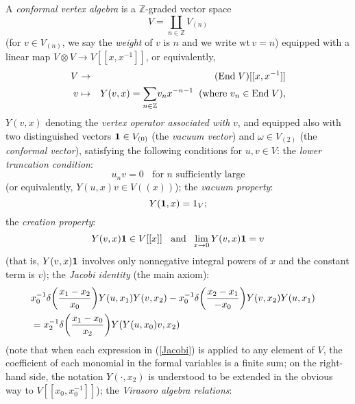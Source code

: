 \documentclass[12pt]{article}
\begin{document}
\begin{defi}\label{cva}
{\rm A {\it conformal vertex algebra} is a ${\mathbb Z}$-graded vector
space
\begin{equation}\label{Vgrading}
V=\coprod_{n\in{\mathbb Z}} V_{(n)}
\end{equation}
(for $v\in V_{(n)}$, we say the {\it weight} of $v$ is $n$ and we write
$\mbox{wt}\, v=n$)
equipped with a linear map $V\otimes V\to V[[x,
x^{-1}]]$, or equivalently,
\begin{eqnarray}\label{YforV}
V&\to&({\rm End}\; V)[[x, x^{-1}]] \nonumber\\
v&\mapsto& Y(v,
x)={\displaystyle \sum_{n\in{\mathbb Z}}}v_{n}x^{-n-1} \;\;(
\mbox{where }v_{n}\in{\rm End} \;V),
\end{eqnarray}
$Y(v, x)$ denoting the {\it vertex operator associated with} $v$, and
equipped also with two distinguished vectors ${\bf 1}\in V_{(0)}$ (the
{\it vacuum vector}) and $\omega\in V_{(2)}$ (the {\it conformal
vector}), satisfying the following conditions for $u,v \in V$:
the {\it lower truncation condition}:
\begin{equation}\label{ltc}
u_{n}v=0\;\;\mbox{ for }n\mbox{ sufficiently large}
\end{equation}
(or equivalently, $Y(u, x)v\in V((x))$); the {\it vacuum property}:
\begin{equation}\label{1left}
Y({\bf 1}, x)=1_V;
\end{equation}
the {\it creation property}:
\begin{equation}\label{1right}
Y(v, x){\bf 1} \in V[[x]]\;\;\mbox{ and }\;\lim_{x\rightarrow
0}Y(v, x){\bf 1}=v
\end{equation}
(that is, $Y(v, x){\bf 1}$ involves only nonnegative integral powers
of $x$ and the constant term is $v$); the {\it Jacobi identity} (the
main axiom):
\begin{eqnarray}
&x_0^{-1}\delta
\bigg({\displaystyle\frac{x_1-x_2}{x_0}}\bigg)Y(u, x_1)Y(v,
x_2)-x_0^{-1} \delta
\bigg({\displaystyle\frac{x_2-x_1}{-x_0}}\bigg)Y(v, x_2)Y(u,
x_1)&\nonumber \\ &=x_2^{-1} \delta
\bigg({\displaystyle\frac{x_1-x_0}{x_2}}\bigg)Y(Y(u, x_0)v,
x_2)&\label{Jacobi}
\end{eqnarray}
(note that when each expression in (\ref{Jacobi}) is applied to any
element of $V$, the coefficient of each monomial in the formal
variables is a finite sum; on the right-hand side, the notation
$Y(\cdot, x_2)$ is understood to be extended in the obvious way to
$V[[x_0, x^{-1}_0]]$); the {\em Virasoro algebra relations}:
}
\end{defi}
\end{document}
